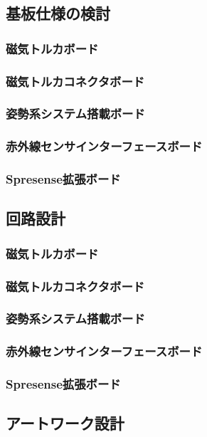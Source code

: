 \subsection{基板仕様の検討}
\subsubsection{磁気トルカボード}
\subsubsection{磁気トルカコネクタボード}
\subsubsection{姿勢系システム搭載ボード}
\subsubsection{赤外線センサインターフェースボード}
\subsubsection{Spresense拡張ボード}

\subsection{回路設計}
\subsubsection{磁気トルカボード}
\subsubsection{磁気トルカコネクタボード}
\subsubsection{姿勢系システム搭載ボード}
\subsubsection{赤外線センサインターフェースボード}
\subsubsection{Spresense拡張ボード}

\subsection{アートワーク設計}
